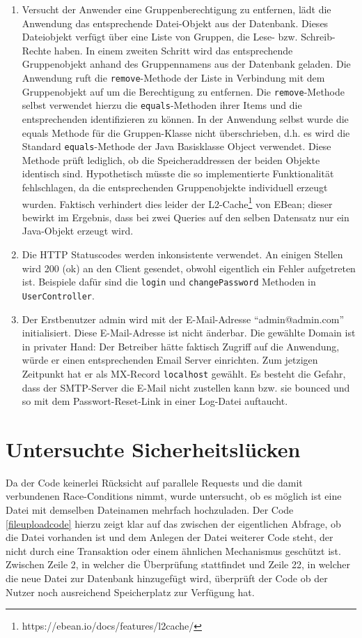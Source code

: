 \documentclass[12pt,DIV14,BCOR10mm,a4paper,parskip=half-,headsepline,headinclude,english,ngerman,bibliography=totocnumbered]{scrreprt}
\begin{document}
\begin{enumerate}
  \item Versucht der Anwender eine Gruppenberechtigung zu entfernen, lädt die Anwendung das entsprechende Datei-Objekt aus der Datenbank. Dieses Dateiobjekt verfügt über eine Liste von Gruppen, die Lese- bzw. Schreib-Rechte haben. In einem zweiten Schritt wird das entsprechende Gruppenobjekt anhand des Gruppennamens aus der Datenbank geladen. Die Anwendung ruft die \texttt{remove}-Methode der Liste in Verbindung mit dem Gruppenobjekt auf um die Berechtigung zu entfernen. Die \texttt{remove}-Methode selbst verwendet hierzu die \texttt{equals}-Methoden ihrer Items und die entsprechenden identifizieren zu können. In der Anwendung selbst wurde die equals Methode für die Gruppen-Klasse nicht überschrieben, d.h. es wird die Standard \texttt{equals}-Methode der Java Basisklasse Object verwendet. Diese Methode prüft lediglich, ob die Speicheraddressen der beiden Objekte identisch sind. Hypothetisch müsste die so implementierte Funktionalität fehlschlagen, da die entsprechenden Gruppenobjekte individuell erzeugt wurden. Faktisch verhindert dies leider der L2-Cache\footnote{https://ebean.io/docs/features/l2cache/} von EBean; dieser bewirkt im Ergebnis, dass bei zwei Queries auf den selben Datensatz nur ein Java-Objekt erzeugt wird.
  	\item Die HTTP Statuscodes werden inkonsistente verwendet. An einigen Stellen wird 200 (ok) an den Client gesendet, obwohl eigentlich ein Fehler aufgetreten ist. Beispiele dafür sind die \texttt{login} und \texttt{changePassword} Methoden in \texttt{UserController}.
  	\item Der Erstbenutzer admin wird mit der E-Mail-Adresse \enquote{admin@admin.com} initialisiert. Diese E-Mail-Adresse ist nicht änderbar. Die gewählte Domain ist in privater Hand: Der Betreiber hätte faktisch Zugriff auf die Anwendung, würde er einen entsprechenden Email Server einrichten. Zum jetzigen Zeitpunkt hat er als MX-Record \texttt{localhost} gewählt. Es besteht die Gefahr, dass der SMTP-Server die E-Mail nicht zustellen kann bzw. sie bounced und so mit dem Passwort-Reset-Link in einer Log-Datei auftaucht.

\end{enumerate}

\chapter{Untersuchte Sicherheitslücken}

Da der Code keinerlei Rücksicht auf parallele Requests und die damit verbundenen Race-Conditions nimmt, wurde untersucht, ob es möglich ist eine Datei mit demselben Dateinamen mehrfach hochzuladen. Der Code \ref{fileuploadcode} hierzu zeigt klar auf das zwischen der eigentlichen Abfrage, ob die Datei vorhanden ist und dem Anlegen der Datei weiterer Code steht, der nicht durch eine Transaktion oder einem ähnlichen Mechanismus geschützt ist. Zwischen Zeile 2, in welcher die Überprüfung stattfindet und Zeile 22, in welcher die neue Datei zur Datenbank hinzugefügt wird, überprüft der Code ob der Nutzer noch ausreichend Speicherplatz zur Verfügung hat.
\end{document}
